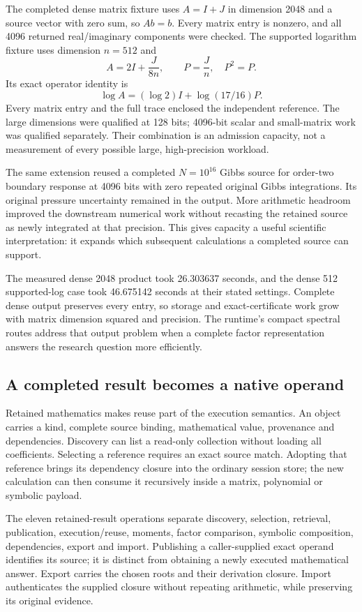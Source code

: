 The completed dense matrix fixture uses $A=I+J$ in dimension 2048 and a source vector with zero sum, so $Ab=b$. Every matrix entry is nonzero, and all 4096 returned real/imaginary components were checked. The supported logarithm fixture uses dimension $n=512$ and
\[
 A=2I+\frac{J}{8n},\qquad P=\frac Jn,\quad P^2=P.
\]
Its exact operator identity is
\[
 \log A=(\log2)I+\log(17/16)P.
\]
Every matrix entry and the full trace enclosed the independent reference. The large dimensions were qualified at 128 bits; 4096-bit scalar and small-matrix work was qualified separately. Their combination is an admission capacity, not a measurement of every possible large, high-precision workload.

The same extension reused a completed $N=10^{16}$ Gibbs source for order-two boundary response at 4096 bits with zero repeated original Gibbs integrations. Its original pressure uncertainty remained in the output. More arithmetic headroom improved the downstream numerical work without recasting the retained source as newly integrated at that precision. This gives capacity a useful scientific interpretation: it expands which subsequent calculations a completed source can support.

The measured dense 2048 product took 26.303637 seconds, and the dense 512 supported-log case took 46.675142 seconds at their stated settings. Complete dense output preserves every entry, so storage and exact-certificate work grow with matrix dimension squared and precision. The runtime's compact spectral routes address that output problem when a complete factor representation answers the research question more efficiently.

\subsection{A completed result becomes a native operand}
\label{v3-runtime-retained}

Retained mathematics makes reuse part of the execution semantics. An object carries a kind, complete source binding, mathematical value, provenance and dependencies. Discovery can list a read-only collection without loading all coefficients. Selecting a reference requires an exact source match. Adopting that reference brings its dependency closure into the ordinary session store; the new calculation can then consume it recursively inside a matrix, polynomial or symbolic payload.

The eleven retained-result operations separate discovery, selection, retrieval, publication, execution/reuse, moments, factor comparison, symbolic composition, dependencies, export and import. Publishing a caller-supplied exact operand identifies its source; it is distinct from obtaining a newly executed mathematical answer. Export carries the chosen roots and their derivation closure. Import authenticates the supplied closure without repeating arithmetic, while preserving its original evidence.

